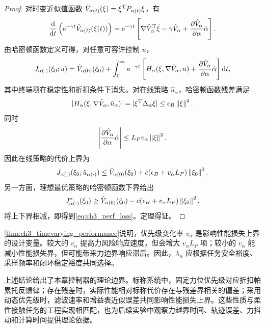 \begin{proof}
对时变近似值函数 $\hat V_{\alpha(t)}(\xi)=\xi^{\mathrm{T}}P_{\alpha(t)}\xi$，有
\begin{equation}
  \frac{\mathrm{d}}{\mathrm{d} t}\left(\mathrm{e}^{-\gamma t}\hat V_{\alpha(t)}(\xi(t))\right)=\mathrm{e}^{-\gamma t}\left[\nabla \hat V_\alpha^{\mathrm{T}}\dot\xi-\gamma\hat V_\alpha+\frac{\partial \hat V_\alpha}{\partial\alpha}\dot\alpha\right].
\end{equation}
由哈密顿函数定义可得，对任意可容许控制 $u$，
\begin{equation}
  J_{\alpha(\cdot)}(\xi_0;u)=\hat V_{\alpha(0)}(\xi_0)+\int_0^\infty\mathrm{e}^{-\gamma t}\left[H_\alpha(\xi,\nabla\hat V_\alpha,u)+\frac{\partial \hat V_\alpha}{\partial\alpha}\dot\alpha\right]\mathrm{d} t,
  \label{eq:ch3_J_identity_timevarying}
\end{equation}
其中终端项在稳定性和折扣条件下消失。对在线策略 $\hat u_\alpha$，哈密顿函数残差满足
\begin{equation}
  |H_\alpha(\xi,\nabla\hat V_\alpha,
  \hat u_\alpha)|=|\xi^{\mathrm{T}}\Delta_\alpha\xi|\le\epsilon_B\left\lVert \xi\right\rVert^2 .
\end{equation}
同时
\begin{equation}
  \left|\frac{\partial \hat V_\alpha}{\partial\alpha}\dot\alpha\right|\le L_Pv_\alpha\left\lVert \xi\right\rVert^2 .
\end{equation}
因此在线策略的代价上界为
\begin{equation}
  J_{\alpha(\cdot)}(\xi_0;\hat u_{\alpha(\cdot)})\le \hat V_{\alpha(0)}(\xi_0)+c(\epsilon_B+v_\alpha L_P)\left\lVert \xi_0\right\rVert^2 .
\end{equation}
另一方面，理想最优策略的哈密顿函数下界给出
\begin{equation}
  J_{\alpha(\cdot)}^*(\xi_0)\ge \hat V_{\alpha(0)}(\xi_0)-c(\epsilon_B+v_\alpha L_P)\left\lVert \xi_0\right\rVert^2 .
\end{equation}
将上下界相减，即得到\eqref{eq:ch3_perf_loss}。定理得证。
\end{proof}

\begin{remark}
\cref{thm:ch3_timevarying_performance}说明，优先级变化率 $v_\alpha$ 是影响性能损失上界的设计变量。较大的 $v_\alpha$ 提高力风险响应速度，但会增大 $v_\alpha L_P$ 项；较小的 $v_\alpha$ 能减小性能损失界，但可能带来力边界响应滞后。因此，$\lambda_\alpha$ 应根据任务安全裕度、采样频率和闭环稳定裕度共同选择。
\end{remark}

上述结论给出了本章控制器的理论边界。标称系统中，固定力位优先级对应折扣帕累托反馈律；存在残差时，实际性能相对标称代价存在与残差界相关的偏差；采用动态优先级时，滤波速率和增益表近似误差共同影响性能损失上界。这些性质与柔性接触任务的工程实现相匹配，也为后续实验中观察力越界时间、轨迹误差、力抖动和计算时间提供理论依据。

